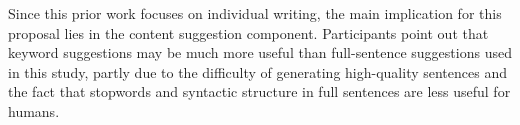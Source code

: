
Since this prior work focuses on individual writing, the main implication for this proposal lies in the content suggestion component. 
Participants point out 
that keyword suggestions may be much more useful than full-sentence suggestions used in this study, partly due to the difficulty of generating high-quality 
sentences and the fact that stopwords and syntactic structure in full sentences are less useful for humans.
